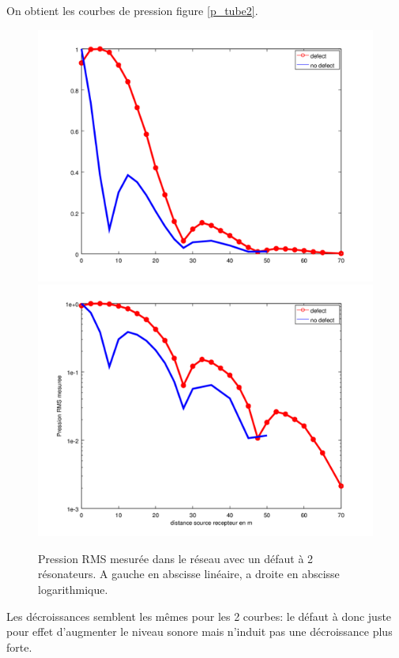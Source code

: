 On obtient les courbes de pression figure \ref{p_tube2}.

\begin{figure}[!h]
\centering
\includegraphics[scale=0.3]{./images_chp3/comparaison_decroissance_lin.png}\hfill
\includegraphics[scale=0.3]{./images_chp3/comparaison_decroissance_log.png}
\caption{\label{_tube} Pression RMS mesurée dans le réseau avec un défaut à 2 résonateurs. A gauche en abscisse linéaire, a droite en abscisse logarithmique.}
\end{figure}

Les décroissances semblent les mêmes pour les 2 courbes: le défaut à donc juste pour effet d'augmenter le niveau sonore mais n'induit pas une décroissance plus forte.


